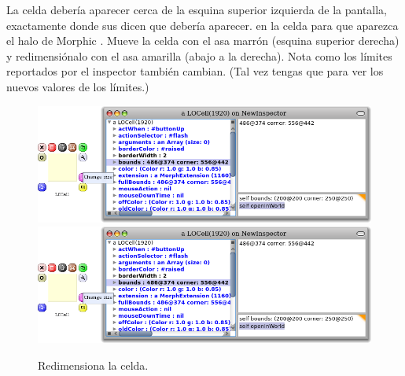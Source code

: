 \documentclass[a4paper,10pt,twoside]{book}
\begin{document}

La celda deber\'ia aparecer cerca de la esquina superior izquierda de la pantalla, exactamente donde sus  dicen que deber\'ia aparecer. 
\metaclick en la celda para que aparezca el halo de Morphic . %
Mueve la celda con el asa marr\'on (esquina superior derecha) y redimensi\'onalo con el asa amarilla (abajo a la derecha).
Nota como los l\'imites reportados por el inspector tambi\'en cambian. 
(Tal vez tengas que \actclick{}  para ver los nuevos valores de los l\'imites.)



\begin{figure}[htbp]
\centering
\ifluluelse
	{\includegraphics[width=\textwidth]{LOCellResize} }
	{\includegraphics[scale=0.7]{LOCellResize} }
\caption{Redimensiona la celda.}
\end{figure}
\end{document}
